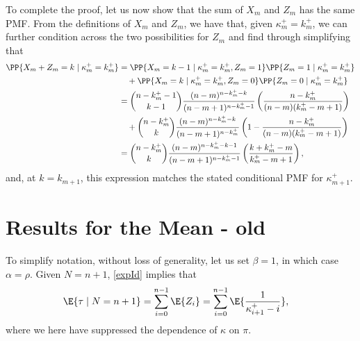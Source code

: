 To complete the proof, let us now show that the sum of $X_m$ and $Z_m$ has the same PMF. From the definitions of $X_m$ and $Z_m$, we have that, given $\kappa_m^+ = k_m^+$, we can further condition across the two possibilities for $Z_m$ and find through simplifying that
\begin{align}
\PP{X_m + Z_m = k \mid \kappa_m^+ = k_m^+}
&=
\PP{X_m = k - 1 \mid \kappa_m^+ = k_m^+, Z_m = 1}\PP{Z_m = 1 \mid \kappa_m^+ = k_m^+}
\nonumber
\\
&
\quad
+
\PP{X_m = k \mid \kappa_m^+ = k_m^+, Z_m = 0}\PP{Z_m = 0 \mid \kappa_m^+ = k_m^+}
\\
&=
{n - k_m^+ - 1 \choose k-1}\frac{(n-m)^{n-k_m^+-k}}{(n-m+1)^{n-k_m^+-1}}
\left(\frac{n-k_m^+}{(n-m)(k_m^+ - m + 1)} \right)
\nonumber
\\
&
\quad
+
{n - k_m^+ \choose k}\frac{(n-m)^{n-k_m^+-k}}{(n-m+1)^{n-k_m^+}}
\left(1- \frac{n-k_m^+}{(n-m)(k_m^+ - m + 1)} \right)
\\
&=
{n - k_m^+ \choose k}\frac{(n-m)^{n-k_m^+-k-1}}{(n-m+1)^{n-k_m^+-1}}
\left(
\frac{k
+
k_m^+
- 
m }{k_m^+-m+1}
\right)
,
\end{align}
and, at $k = k_{m+1}$, this expression matches the stated conditional PMF for $\kappa_{m+1}^+$.
\hfill\Halmos\endproof

\section{Results for the Mean - old }


To simplify notation, without loss of generality, let us set $\beta = 1$, in which case $\alpha = \rho$. Given $N = n+1$, \eqref{expId}  implies that
\begin{align}
\E{\tau \mid N = n + 1}
&=
\sum_{i=0}^{n-1}\E{Z_i}
=
\sum_{i=0}^{n-1}\E{\frac{1}{\kappa_{i+1}^+ - i}}
,
\end{align}
where we here have suppressed the dependence of $\kappa$ on $\pi$. 


